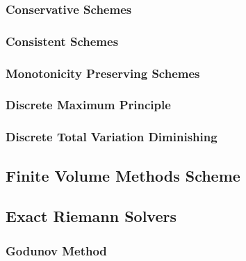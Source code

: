 \documentclass[
  fourColumns,
  landscape
]{formularyETH/formularyETH}
\begin{document}
    \subsubsection{Conservative Schemes}\label{subsec:conservative_schemes}
      
    \subsubsection{Consistent Schemes}\label{subsec:consistent_schemes}
      
    \subsubsection{Monotonicity Preserving Schemes}\label{subsec:monotonicity_preserving_schemes}
      
      
    \subsubsection{Discrete Maximum Principle}\label{subsec:discrete_maximum_principle}
      
    \subsubsection{Discrete Total Variation Diminishing}\label{subsec:total_variation_diminishing}
      
      \label{subsubsec:hartens_lemma}
      
\vfill\columnbreak
\subsection*{Finite Volume Methods Scheme}
  \subsection{Exact Riemann Solvers}\label{subsec:exact_riemann_solvers}
    \subsubsection{Godunov Method}\label{subsec:godunov_method}
      
      
      \label{subsubsec:cfl_condition}
      
\end{document}
